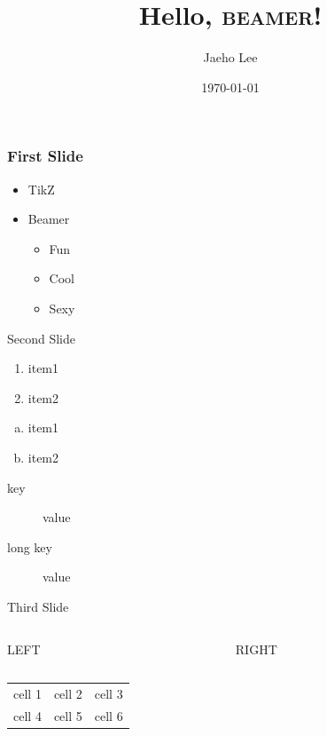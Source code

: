 \documentclass{beamer}
\title{Hello, \textsc{beamer}!}
\author{Jaeho Lee}
\date{\today}
\begin{document}
\maketitle
\begin{frame}
  \frametitle{First Slide}
  \begin{itemize}
    \item<3> TikZ
    \item<1-> Beamer
      \begin{itemize}
        \item<2> Fun
        \item<1,3> Cool
        \item<-2> Sexy
      \end{itemize}
  \end{itemize}
\end{frame}
\begin{frame}{Second Slide}
  \pause
  \begin{enumerate}
    \item item1
    \item item2
  \end{enumerate}
  \pause
  \begin{enumerate}[(a)]
    \item item1
    \pause
    \item item2
  \end{enumerate}
  \pause
  \begin{description}
    \item[key] value
    \item[long key] value
  \end{description}
\end{frame}
\begin{frame}{Third Slide}
  \begin{columns}
    \begin{column}{0.5\textwidth}
      \LARGE LEFT
    \end{column}
    \begin{column}{0.5\textwidth}
      \LARGE RIGHT
    \end{column}
  \end{columns}
  \vspace{2cm}
  \begin{center}
    \begin{tabular}{ccc}
      cell 1 & cell 2 & cell 3\\
      cell 4 & cell 5 & cell 6
    \end{tabular}
  \end{center}
\end{frame}
\end{document}
